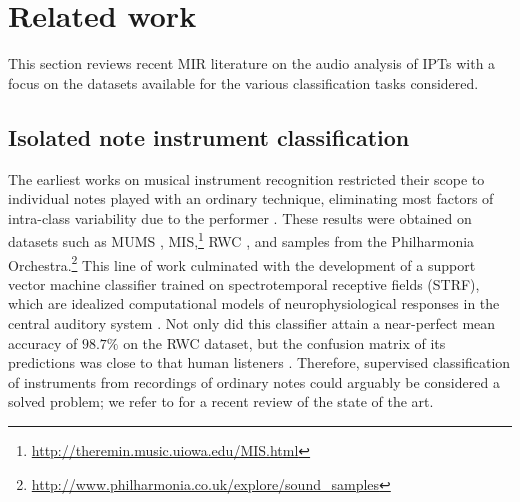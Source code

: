 \section{Related work}
This section reviews recent MIR literature on the audio analysis of IPTs with a focus on the datasets available for the various classification tasks considered.

\subsection{Isolated note instrument classification}
The earliest works on musical instrument recognition restricted their scope to individual notes played with an ordinary technique, eliminating most factors of intra-class variability due to the performer \cite{martin1998asa,brown1999jasa,eronen2000icassp,herrera2003jnmr,wieczorkowska2003jiis,kaminskyj2005jiis,benetos2006icassp}.
These results were obtained on datasets such as MUMS \cite{opolko1989dataset}, MIS,\footnote{\url{http://theremin.music.uiowa.edu/MIS.html}} RWC \cite{goto2003ismir}, and samples from the Philharmonia Orchestra.\footnote{\url{http://www.philharmonia.co.uk/explore/sound_samples}}
This line of work culminated with the development of a support vector machine classifier trained on spectrotemporal receptive fields (STRF), which are idealized computational models of neurophysiological responses in the central auditory system \cite{chi2005jasa}.
Not only did this classifier attain a near-perfect mean accuracy of $98.7\%$ on the RWC dataset, but the confusion matrix of its predictions was close to that human listeners \cite{patil2012plos}.
Therefore, supervised classification of instruments from recordings of ordinary notes could arguably be considered a solved problem; we refer to \cite{bhalke2016jiis} for a recent review of the state of the art.

